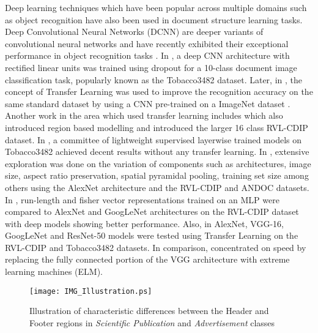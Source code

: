\documentclass[10pt,conference,a4paper]{IEEEtran}
\begin{document}
Deep learning techniques which have been popular across multiple domains such as object recognition have also been used in document structure learning tasks. Deep Convolutional Neural Networks (DCNN) are deeper variants of convolutional neural networks \cite{lecun1998} and have recently exhibited their exceptional performance in object recognition tasks \cite{Krizhevsky2012,szegedy2015going}. In \cite{kang2014}, a deep CNN architecture with rectified linear units was trained using dropout \cite{Srivastava2014} for a 10-class document image classification task, popularly known as the Tobacco3482 dataset\cite{Kumar2014}. Later, in \cite{afzal2015}, the concept of Transfer Learning \cite{Pan2010} was used to improve the recognition accuracy on the same standard dataset by using a CNN pre-trained on a ImageNet dataset \cite{deng2009}. Another work in the area which used transfer learning includes \cite{harley2015evaluation} which also introduced region based modelling and introduced the larger 16 class RVL-CDIP dataset. In \cite{roy2016generalized}, a committee of lightweight supervised layerwise trained models on Tobacco3482 achieved decent results without any transfer learning. In \cite{tensmeyer2017analysis}, extensive exploration was done on the variation of components such as architectures, image size, aspect ratio preservation, spatial pyramidal pooling, training set size among others using the AlexNet architecture and the RVL-CDIP and ANDOC datasets. In \cite{csurka2016right}, run-length and fisher vector representations trained on an MLP were compared to AlexNet and GoogLeNet architectures on the RVL-CDIP dataset with deep models showing better performance. Also, in \cite{afzal2017cutting} AlexNet, VGG-16, GoogLeNet and ResNet-50 models were tested using Transfer Learning on the RVL-CDIP and Tobacco3482 datasets. In comparison, \cite{kolsch2017real} concentrated on speed by replacing the fully connected portion of the VGG architecture with extreme learning machines (ELM).

\begin{figure}[]
	\centering
	\texttt{[image: IMG\_Illustration.ps]}
	\caption{Illustration of characteristic differences between the Header and Footer regions in \textit{Scientific Publication} and \textit{Advertisement} classes} \label{fig:classDif}
\end{figure}
\end{document}
